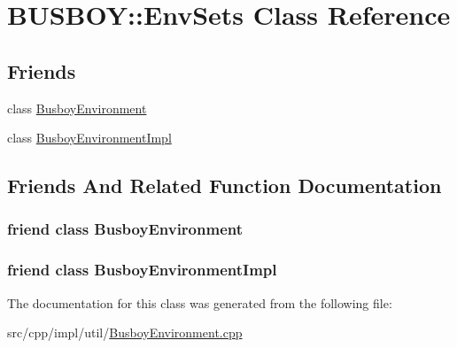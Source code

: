 \hypertarget{classBUSBOY_1_1EnvSets}{
\section{BUSBOY::EnvSets Class Reference}
\label{classBUSBOY_1_1EnvSets}
}
\subsection*{Friends}
\begin{DoxyCompactItemize}
\item 
class \hyperlink{classBUSBOY_1_1EnvSets_ac40d06d4f5fe44be5340245ffc5d38d0}{BusboyEnvironment}
\item 
class \hyperlink{classBUSBOY_1_1EnvSets_a52a9e762268048dc71d22e27e7a8b29e}{BusboyEnvironmentImpl}
\end{DoxyCompactItemize}


\subsection{Friends And Related Function Documentation}
\hypertarget{classBUSBOY_1_1EnvSets_ac40d06d4f5fe44be5340245ffc5d38d0}{
\subsubsection[{BusboyEnvironment}]{\setlength{\rightskip}{0pt plus 5cm}friend class {\bf BusboyEnvironment}}}
\label{classBUSBOY_1_1EnvSets_ac40d06d4f5fe44be5340245ffc5d38d0}
\hypertarget{classBUSBOY_1_1EnvSets_a52a9e762268048dc71d22e27e7a8b29e}{
\subsubsection[{BusboyEnvironmentImpl}]{\setlength{\rightskip}{0pt plus 5cm}friend class {\bf BusboyEnvironmentImpl}}}
\label{classBUSBOY_1_1EnvSets_a52a9e762268048dc71d22e27e7a8b29e}


The documentation for this class was generated from the following file:\begin{DoxyCompactItemize}
\item 
src/cpp/impl/util/\hyperlink{BusboyEnvironment_8cpp}{BusboyEnvironment.cpp}\end{DoxyCompactItemize}
